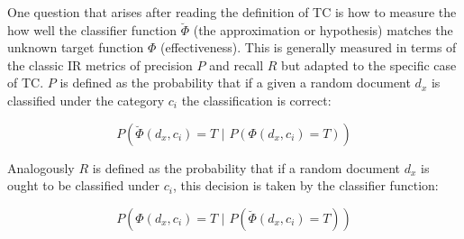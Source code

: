 One question that arises after reading the definition of TC is how to measure
 the how well the classifier function  $\breve{\Phi}$ (the approximation or hypothesis) matches the unknown target function  $\Phi$
 (effectiveness).  This is generally measured in terms of the classic IR
 metrics of precision  $P$  and recall  $R$ but adapted to the specific case
 of \ac{TC}. $P$  is defined as the probability that if a given a random document
 $d_{x}$  is classified under the category  $c_{i}$  the classification is
 correct:

 $$P(\breve{\Phi}(d_{x},c_{i})=T\,\,|\,\, P(\Phi(d_{x},c_{i})=T))$$


 Analogously  $R$  is defined as the probability that if a random document 
 $d_{x}$ is ought to be classified under  $c_{i}$,  this decision is taken
 by the classifier function: 

 $$P(\Phi(d_{x},c_{i})=T\,\,|\,\, P(\breve{\Phi}(d_{x},c_{i})=T))$$
 



